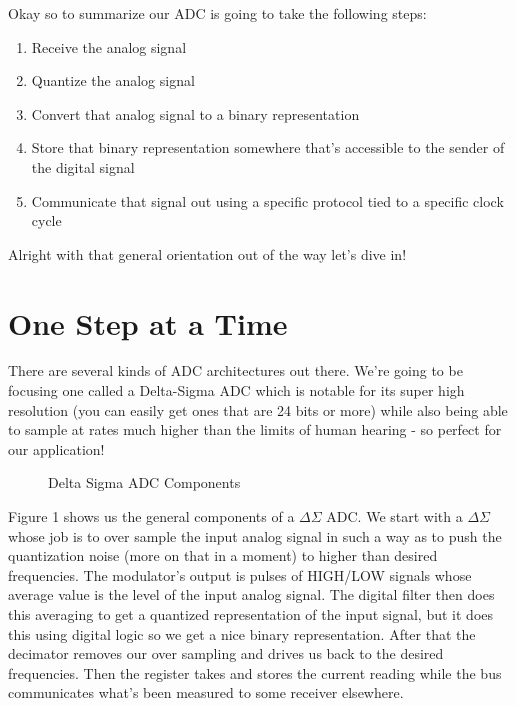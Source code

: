 \documentclass[10pt,a5paper]{book}
\begin{document}
Okay so to summarize our ADC is going to take the following steps:

\begin{enumerate}
\item Receive the analog signal
\item Quantize the analog signal
\item Convert that analog signal to a binary representation
\item Store that binary representation somewhere that's accessible to the sender of the digital signal
\item Communicate that signal out using a specific protocol tied to a specific clock cycle
\end{enumerate}

Alright with that general orientation out of the way let's dive in!

\section{One Step at a Time}
There are several kinds of ADC architectures out there. We're going to be focusing one called a Delta-Sigma ADC which is notable for its super high resolution (you can easily get ones that are 24 bits or more) while also being able to sample at rates much higher than the limits of human hearing - so perfect for our application! 

\begin{figure}[!htb]
\caption{\label{fig:my-label} Delta Sigma ADC Components}
\end{figure}

Figure 1 shows us the general components of a $\Delta \Sigma$ ADC. We start with a $\Delta \Sigma$ whose job is to over sample the input analog signal in such a way as to push the quantization noise (more on that in a moment) to higher than desired frequencies. The modulator's output is pulses of HIGH/LOW signals whose average value is the level of the input analog signal. The digital filter then does this averaging to get a quantized representation of the input signal, but it does this using digital logic so we get a nice binary representation. After that the decimator removes our over sampling and drives us back to the desired frequencies. Then the register takes and stores the current reading while the bus communicates what's been measured to some receiver elsewhere. 
\end{document}
